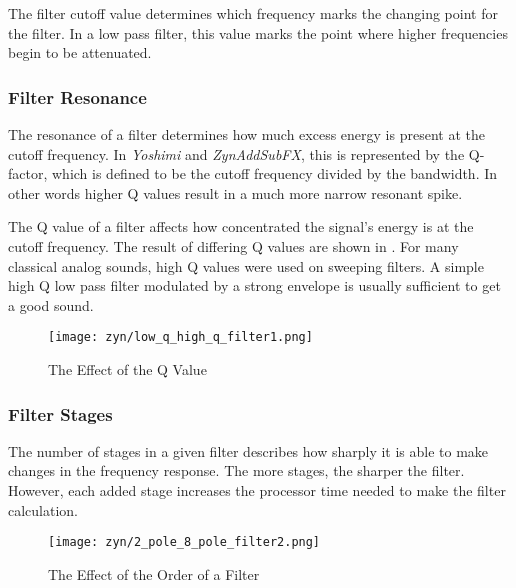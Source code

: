    The filter cutoff value determines which frequency marks the changing
   point for the filter. In a low pass filter, this value marks the point
   where higher frequencies begin to be attenuated.

\subsubsection{Filter Resonance}
\label{subsubsec:filter_resonance}

   The resonance of a filter determines how much excess energy is present at
   the cutoff frequency. In \textsl{Yoshimi} and \textsl{ZynAddSubFX},
   this is represented by the Q-factor,
   which is defined to be the cutoff frequency divided by the bandwidth. In
   other words higher Q values result in a much more narrow resonant spike.

   The Q value of a filter affects how concentrated
   the signal’s energy is at the cutoff frequency. The result of differing Q
   values are shown in .
   For many classical analog sounds, high Q values were used on sweeping
   filters. A simple high Q low pass filter modulated by a strong envelope is
   usually sufficient to get a good sound.

\begin{figure}[H]
   \centering
   \texttt{[image: zyn/low\_q\_high\_q\_filter1.png]}
   \caption[Low Q vs. High Q]{The Effect of the Q Value}
   \label{fig:low_q_vs_high_q}
\end{figure}

\subsubsection{Filter Stages}
\label{subsubsec:filter_stages}

   The number of stages in a given filter describes how sharply it is able to
   make changes in the frequency response.
   The more stages, the sharper the filter.
   However, each added stage increases the processor time needed to make the
   filter calculation.

\begin{figure}[H]
   \centering
   \texttt{[image: zyn/2\_pole\_8\_pole\_filter2.png]}
   \caption[2 Pole vs. 8 Pole Filter]{The Effect of the Order of a Filter}
   \label{fig:2_pole_vs_8_pole_filter}
\end{figure}


